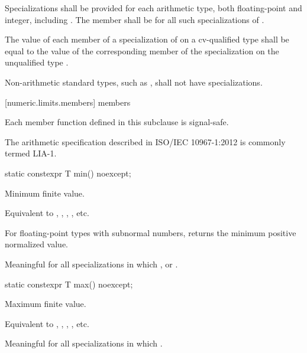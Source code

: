 \pnum
Specializations shall be provided for each
arithmetic type,
both floating-point and integer, including
.
The member
shall be
for all such specializations of
.

\pnum
The value of each member of a specialization of
 on a cv-qualified type
 shall be equal to the value of the corresponding member of
the specialization on the unqualified type .

\pnum
Non-arithmetic standard types, such as
, shall not have specializations.

[numeric.limits.members]{ members}

\pnum
{}%
Each member function defined in this subclause is signal-safe.
\begin{note}
%
The arithmetic specification described in ISO/IEC 10967-1:2012 is
commonly termed LIA-1.
\end{note}

%
\begin{itemdecl}
static constexpr T min() noexcept;
\end{itemdecl}

\begin{itemdescr}
\pnum
Minimum finite value.
\begin{footnote}
Equivalent to , ,
, , etc.
\end{footnote}

%
\pnum
For floating-point types with subnormal numbers, returns the minimum positive
normalized value.

\pnum
Meaningful for all specializations in which
,
or
.
\end{itemdescr}

%
\begin{itemdecl}
static constexpr T max() noexcept;
\end{itemdecl}

\begin{itemdescr}
\pnum
Maximum finite value.
\begin{footnote}
Equivalent to , ,
, , etc.
\end{footnote}

\pnum
Meaningful for all specializations in which
.
\end{itemdescr}

